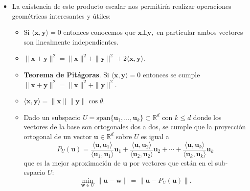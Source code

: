 \documentclass[10pt,handout]{beamer}
\theoremstyle{plain} %
\theoremstyle{plain} %
\theoremstyle{plain} %
\theoremstyle{plain} %
\theoremstyle{definition}
\theoremstyle{example}
\theoremstyle{example}
\theoremstyle{remark}
\theoremstyle{remark}
\begin{document}
\begin{frame}
\begin{itemize}
\item La existencia de este producto escalar nos permitiría realizar operaciones geométricas 
interesantes y útiles:
\begin{itemize}
\item Si $\langle \mathbf{x},\mathbf{y} \rangle =0$ entonces conocemos que $\mathbf{x} \bot \mathbf{y},$ en particular ambos vectores son linealmente independientes.
\item $\|\mathbf{x}+\mathbf{y}\|^2 =  \|\mathbf{x}\|^2  + \|\mathbf{y}\|^2 + 2 \langle \mathbf{x},\mathbf{y} \rangle.$
\item \textbf{Teorema de Pitágoras}. Si $\langle \mathbf{x},\mathbf{y} \rangle =0$ entonces se cumple
$\|\mathbf{x}+\mathbf{y}\|^2 = \|\mathbf{x}\|^2  + \|\mathbf{y}\|^2.$
\item $\langle \mathbf{x},\mathbf{y} \rangle = \|\mathbf{x}\| \|\mathbf{y}\| \cos \theta.$
\item Dado un subspacio $U=\mathrm{span}\{\mathbf{u}_1,\ldots,\mathbf{u}_k\} \subset \mathbb{R}^d$ con
$k \le d$ donde los vectores de la base son ortogonales dos a dos, se cumple que la proyección ortogonal
de un vector $\mathbf{u} \in \mathbb{R}^d$ sobre $U$ es igual a
$$
P_U(\mathbf{u}) = \frac{\langle \mathbf{u},\mathbf{u}_1 \rangle}{\langle \mathbf{u}_1,\mathbf{u}_1 \rangle} \mathbf{u}_1 + \frac{\langle \mathbf{u},\mathbf{u}_2 \rangle}{\langle \mathbf{u}_2,\mathbf{u}_2 \rangle} \mathbf{u}_2 + \cdots + \frac{\langle \mathbf{u},\mathbf{u}_k \rangle}{\langle \mathbf{u}_k,\mathbf{u}_k \rangle} \mathbf{u}_k
$$
que es la mejor aproximación de $\mathbf{u}$ por vectores que están en el sub-espacio $U:$
$$
\min_{\mathbf{w} \in U} \|\mathbf{u} - \mathbf{w}\| = \|\mathbf{u} - P_U(\mathbf{u})\|.
$$
\end{itemize}
\end{itemize}
\end{frame}
\end{document}
